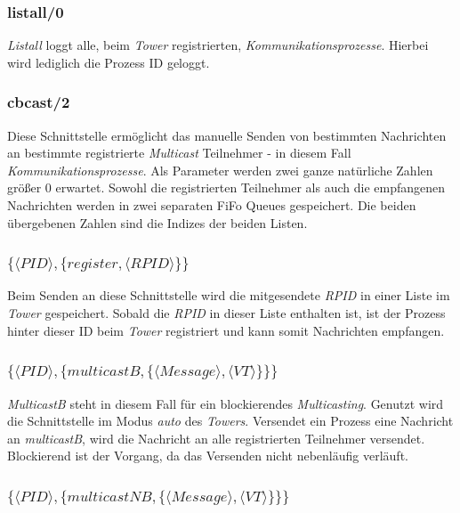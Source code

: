 \subsubsection{listall/0}

\textit{Listall} loggt alle, beim \textit{Tower} registrierten, \textit{Kommunikationsprozesse}. Hierbei wird lediglich die Prozess ID geloggt.

\subsubsection{cbcast/2} \label{tower_cbcast}

Diese Schnittstelle ermöglicht das manuelle Senden von bestimmten Nachrichten an bestimmte registrierte \textit{Multicast} Teilnehmer - in diesem Fall \textit{Kommunikationsprozesse}. Als Parameter werden zwei ganze natürliche Zahlen größer 0 erwartet. Sowohl die registrierten Teilnehmer als auch die empfangenen Nachrichten werden in zwei separaten FiFo Queues gespeichert. Die beiden übergebenen Zahlen sind die Indizes der beiden Listen. 

\subsubsection{$\{\langle PID \rangle,\{register,\langle RPID\rangle\}\}$}

Beim Senden an diese Schnittstelle wird die mitgesendete \textit{RPID} in einer Liste im \textit{Tower} gespeichert. Sobald die \textit{RPID} in dieser Liste enthalten ist, ist der Prozess hinter dieser ID beim \textit{Tower} registriert und kann  somit Nachrichten empfangen.

\subsubsection{$\{\langle PID\rangle,\{multicastB,\{\langle Message\rangle,\langle VT\rangle\}\}\}$}

\textit{MulticastB} steht in diesem Fall für ein blockierendes \textit{Multicasting}. Genutzt wird die Schnittstelle im Modus \textit{auto} des \textit{Towers}. Versendet ein Prozess eine Nachricht an \textit{multicastB}, wird die Nachricht an alle registrierten Teilnehmer versendet. Blockierend ist der Vorgang, da das Versenden nicht nebenläufig verläuft.

\subsubsection{$\{\langle PID\rangle,\{multicastNB,\{\langle Message\rangle,\langle VT\rangle\}\}\}$}

